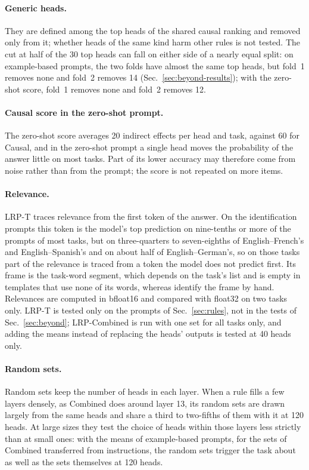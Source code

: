 \documentclass[10pt,a4paper]{article}
\begin{document}
\paragraph{Generic heads.} They are defined among the top heads of the shared causal ranking and removed only from it; whether heads of the same kind harm other rules is not tested. The cut at half of the 30 top heads can fall on either side of a nearly equal split: on example-based prompts, the two folds have almost the same top heads, but fold~1 removes none and fold~2 removes 14 (Sec.~\ref{sec:beyond-results}); with the zero-shot score, fold~1 removes none and fold~2 removes 12.

\paragraph{Causal score in the zero-shot prompt.} The zero-shot score averages 20 indirect effects per head and task, against 60 for Causal, and in the zero-shot prompt a single head moves the probability of the answer little on most tasks. Part of its lower accuracy may therefore come from noise rather than from the prompt; the score is not repeated on more items.

\paragraph{Relevance.} LRP-T traces relevance from the first token of the answer. On the identification prompts this token is the model's top prediction on nine-tenths or more of the prompts of most tasks, but on three-quarters to seven-eighths of English--French's and English--Spanish's and on about half of English--German's, so on those tasks part of the relevance is traced from a token the model does not predict first. Its frame is the task-word segment, which depends on the task's list and is empty in templates that use none of its words, whereas \citet{pham2026fast} identify the frame by hand. Relevances are computed in bfloat16 and compared with float32 on two tasks only. LRP-T is tested only on the prompts of Sec.~\ref{sec:rules}, not in the tests of Sec.~\ref{sec:beyond}; LRP-Combined is run with one set for all tasks only, and adding the means instead of replacing the heads' outputs is tested at 40 heads only.

\paragraph{Random sets.} Random sets keep the number of heads in each layer. When a rule fills a few layers densely, as Combined does around layer 13, its random sets are drawn largely from the same heads and share a third to two-fifths of them with it at 120 heads. At large sizes they test the choice of heads within those layers less strictly than at small ones: with the means of example-based prompts, for the sets of Combined transferred from instructions, the random sets trigger the task about as well as the sets themselves at 120 heads.
\end{document}
